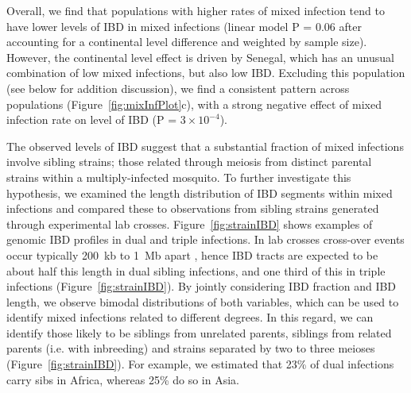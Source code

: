 \documentclass[9pt,lineno]{elife}
\begin{document}
Overall, we find that populations with higher rates of mixed infection tend to have lower levels of IBD in mixed infections (linear model P = 0.06 after accounting for a continental level difference and weighted by sample size).  However, the continental level effect is driven by Senegal, which has an unusual combination of low mixed infections, but also low IBD.  Excluding this population (see below for addition discussion), we find a consistent pattern across populations (Figure~\ref{fig:mixInfPlot}c), with a strong negative effect of mixed infection rate on level of IBD (P = $3\times10^{-4}$).

The observed levels of IBD suggest that a substantial fraction of mixed infections involve sibling strains; those related through meiosis from distinct parental strains within a multiply-infected mosquito.  To further investigate this hypothesis, we examined the length distribution of IBD segments within mixed infections and compared these to observations from sibling strains generated through experimental lab crosses.  Figure~\ref{fig:strainIBD} shows examples of genomic IBD profiles in dual and triple infections.  In lab crosses cross-over events occur typically 200~kb to 1~Mb apart \citet{Miles2016}, hence IBD tracts are expected to be about half this length in dual sibling infections, and one third of this in triple infections (Figure~\ref{fig:strainIBD}).  By jointly considering IBD fraction and IBD length, we observe bimodal distributions of both variables, which can be used to identify mixed infections related to different degrees.  In this regard, we can identify those likely to be siblings from unrelated parents, siblings from related parents (i.e. with inbreeding) and strains separated by two to three meioses (Figure~\ref{fig:strainIBD}).  For example, we estimated that 23\% of dual infections carry sibs in Africa, whereas 25\% do so in Asia.
\end{document}
